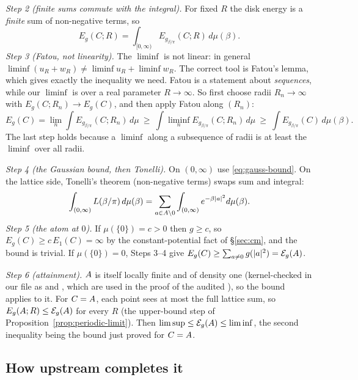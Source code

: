 \emph{Step 2 (finite sums commute with the integral).} For fixed $R$ the disk energy is a \emph{finite} sum of
non-negative terms, so
\[
  E_g(C;R)=\int_{[0,\infty)}E_{g_{\beta/\pi}}(C;R)\,d\mu(\beta).
\]
\emph{Step 3 (Fatou, not linearity).} The $\liminf$ is not linear: in general
$\liminf(u_R+w_R)\ne\liminf u_R+\liminf w_R$. The correct tool is Fatou's lemma, which gives exactly the inequality we
need. Fatou is a statement about \emph{sequences}, while our $\liminf$ is over a real parameter $R\to\infty$. So first
choose radii $R_n\to\infty$ with $E_g(C;R_n)\to E_g(C)$, and then apply Fatou along $(R_n)$:
\[
  E_g(C)=\lim_n\int E_{g_{\beta/\pi}}(C;R_n)\,d\mu\ \ge\ \int\liminf_n E_{g_{\beta/\pi}}(C;R_n)\,d\mu
  \ \ge\ \int E_{g_{\beta/\pi}}(C)\,d\mu(\beta).
\]
The last step holds because a $\liminf$ along a subsequence of radii is at least the $\liminf$ over all radii.

\emph{Step 4 (the Gaussian bound, then Tonelli).} On $(0,\infty)$ use \eqref{eq:gauss-bound}. On the lattice side,
Tonelli's theorem (non-negative terms) swaps sum and integral:
\[
  \int_{(0,\infty)}L(\beta/\pi)\,d\mu(\beta)=\sum_{a\in A\setminus0}\int_{(0,\infty)}e^{-\beta|a|^2}d\mu(\beta).
\]
\emph{Step 5 (the atom at $0$).} If $\mu(\{0\})=c>0$ then $g\ge c$, so $E_g(C)\ge c\,E_1(C)=\infty$ by the constant-potential
fact of \S\ref{sec:cm}, and the bound is trivial. If $\mu(\{0\})=0$, Steps 3--4 give
$E_g(C)\ge\sum_{a\ne0}g(|a|^2)=\mathcal E_g(A)$.

\emph{Step 6 (attainment).} $A$ is itself locally finite and of density one (kernel-checked in our file
 as  and , which are used in the proof of the audited
 \tierA{}), so the bound applies to it. For $C=A$, each point sees at most the full lattice sum, so
$E_g(A;R)\le\mathcal E_g(A)$ for every $R$ (the upper-bound step of Proposition~\ref{prop:periodic-limit}). Then
$\limsup\le\mathcal E_g(A)\le\liminf$, the second inequality being the bound just proved for $C=A$.

\subsection{How upstream completes it}

